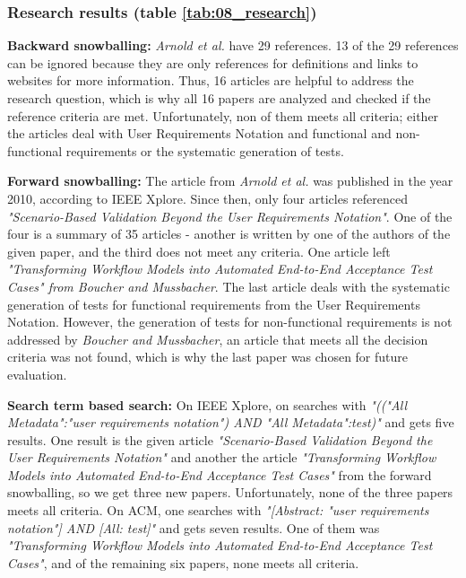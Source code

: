 \subsubsection{Research results (table \ref{tab:08_research})}

\textbf{Backward snowballing:} \textit{Arnold et al.} have 29 references. 13 of the 29 references can be ignored because they are only references for definitions and links to websites for more information. Thus, 16 articles are helpful to address the research question, which is why all 16 papers are analyzed and checked if the reference criteria are met. Unfortunately, non of them meets all criteria; either the articles deal with User Requirements Notation and functional and non-functional requirements or the systematic generation of tests. 

\textbf{Forward snowballing:} The article from \textit{Arnold et al.} was published in the year 2010, according to IEEE Xplore. Since then, only four articles referenced \textit{"Scenario-Based Validation Beyond the User Requirements Notation"}. One of the four is a summary of 35 articles - another is written by one of the authors of the given paper, and the third does not meet any criteria. One article left \textit{"Transforming Workflow Models into Automated End-to-End Acceptance Test Cases" from Boucher and Mussbacher}. The last article deals with the systematic generation of tests for functional requirements from the User Requirements Notation. However, the generation of tests for non-functional requirements is not addressed by \textit{Boucher and Mussbacher}, an article that meets all the decision criteria was not found, which is why the last paper was chosen for future evaluation.

\textbf{Search term based search:} On IEEE Xplore, on searches with \textit{"(("All Metadata":"user requirements notation") AND "All Metadata":test)"} and gets five results. One result is the given article \textit{"Scenario-Based Validation Beyond the User Requirements Notation"} and another the article \textit{"Transforming Workflow Models into Automated End-to-End Acceptance Test Cases"} from the forward snowballing, so we get three new papers. Unfortunately, none of the three papers meets all criteria. On ACM, one searches with \textit{"[Abstract: "user requirements notation"] AND [All: test]"} and gets seven results. One of them was \textit{"Transforming Workflow Models into Automated End-to-End Acceptance Test Cases"}, and of the remaining six papers, none meets all criteria.

